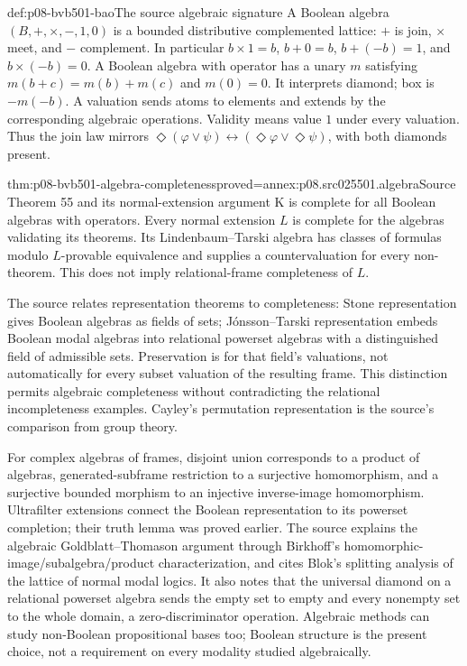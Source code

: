 \begin{hbdefinition}{def:p08-bvb501-bao}{The source algebraic signature}
A Boolean algebra \((B,+,\times,-,1,0)\) is a bounded distributive
complemented lattice: \(+\) is join, \(\times\) meet, and
\(-\) complement. In particular \(b\times1=b\),
\(b+0=b\), \(b+(-b)=1\), and \(b\times(-b)=0\).
A Boolean algebra with operator has a unary \(m\) satisfying
\(m(b+c)=m(b)+m(c)\) and \(m(0)=0\). It interprets diamond;
box is \(-m(-b)\). A valuation sends atoms to elements and extends
by the corresponding algebraic operations. Validity means value \(1\)
under every valuation. Thus the join law mirrors
\(\Diamond(\varphi\lor\psi)\leftrightarrow
(\Diamond\varphi\lor\Diamond\psi)\), with both diamonds present.
\end{hbdefinition}

\begin{hbtheorem}{thm:p08-bvb501-algebra-completeness}{proved=annex:p08.src025501.algebra}{Source Theorem 55 and its normal-extension argument}
K is complete for all Boolean algebras with operators. Every normal
extension \(L\) is complete for the algebras validating its theorems.
Its Lindenbaum--Tarski algebra has classes of formulas modulo
\(L\)-provable equivalence and supplies a countervaluation for every
non-theorem. This does not imply relational-frame completeness of \(L\).
\end{hbtheorem}

The source relates representation theorems to completeness: Stone
representation gives Boolean algebras as fields of sets; J\'onsson--Tarski
representation embeds Boolean modal algebras into relational powerset
algebras with a distinguished field of admissible sets. Preservation is
for that field's valuations, not automatically for every subset valuation
of the resulting frame. This distinction permits algebraic completeness
without contradicting the relational incompleteness examples. Cayley's
permutation representation is the source's comparison from group theory.

For complex algebras of frames, disjoint union corresponds to a product
of algebras, generated-subframe restriction to a surjective homomorphism,
and a surjective bounded morphism to an injective inverse-image
homomorphism. Ultrafilter extensions connect the Boolean representation
to its powerset completion; their truth lemma was proved earlier.
The source explains the algebraic Goldblatt--Thomason argument through
Birkhoff's homomorphic-image/subalgebra/product characterization, and
cites Blok's splitting analysis of the lattice of normal modal logics.
It also notes that the universal diamond on a relational powerset algebra
sends the empty set to empty and every nonempty set to the whole domain,
a zero-discriminator operation. Algebraic methods can study non-Boolean
propositional bases too; Boolean structure is the present choice, not
a requirement on every modality studied algebraically.

